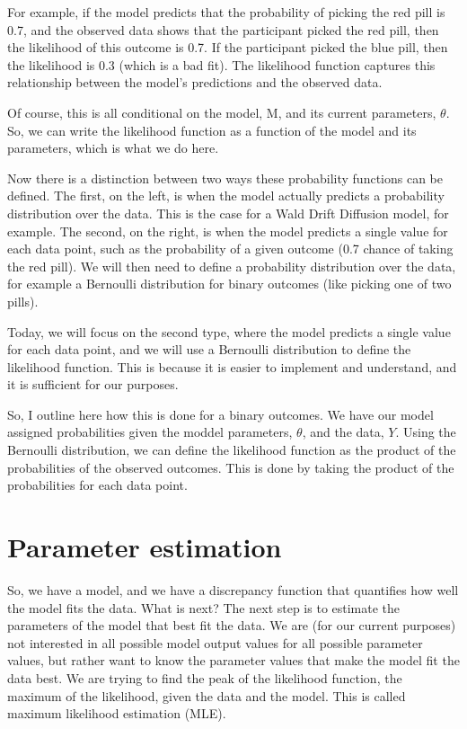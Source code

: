 \documentclass[12pt]{article}
\begin{document}
For example, if the model predicts that the probability of picking the red pill is 0.7, and the observed data shows that the participant picked the red pill, then the likelihood of this outcome is 0.7. If the participant picked the blue pill, then the likelihood is 0.3 (which is a bad fit). The likelihood function captures this relationship between the model's predictions and the observed data.

Of course, this is all conditional on the model, M, and its current parameters, $\theta$. So, we can write the likelihood function as a function of the model and its parameters, which is what we do here.

Now there is a distinction between two ways these probability functions can be defined. The first, on the left, is when the model actually predicts a probability distribution over the data. This is the case for a Wald Drift Diffusion model, for example. The second, on the right, is when the model predicts a single value for each data point, such as the probability of a given outcome (0.7 chance of taking the red pill). We will then need to define a probability distribution over the data, for example a Bernoulli distribution for binary outcomes (like picking one of two pills).

Today, we will focus on the second type, where the model predicts a single value for each data point, and we will use a Bernoulli distribution to define the likelihood function. This is because it is easier to implement and understand, and it is sufficient for our purposes.

So, I outline here how this is done for a binary outcomes. We have our model assigned probabilities given the moddel parameters, $\theta$, and the data, $Y$. Using the Bernoulli distribution, we can define the likelihood function as the product of the probabilities of the observed outcomes. This is done by taking the product of the probabilities for each data point.

\section{Parameter estimation}

So, we have a model, and we have a discrepancy function that quantifies how well the model fits the data. What is next? The next step is to estimate the parameters of the model that best fit the data. We are (for our current purposes) not interested in all possible model output values for all possible parameter values, but rather want to know the parameter values that make the model fit the data best. We are trying to find the peak of the likelihood function, the maximum of the likelihood, given the data and the model. This is called maximum likelihood estimation (MLE). 
\end{document}
